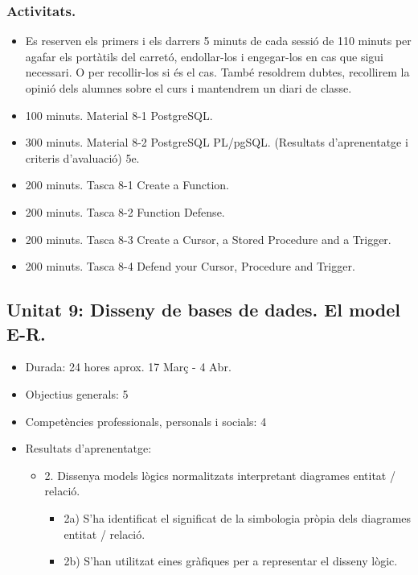 \documentclass[catalan, a4paper, 12pt, titlepage]{article}
\begin{document}
  \subsubsection{Activitats.}
  \begin{itemize}
          \item Es reserven els primers i els darrers 5 minuts de cada sessió de 110 minuts per agafar els portàtils del carretó, endollar-los i engegar-los en cas que sigui necessari. O per recollir-los si és el cas. També resoldrem dubtes, recollirem la opinió dels alumnes sobre el curs i mantendrem un diari de classe.
	  \item 100 minuts. Material 8-1 PostgreSQL.
	  \item 300 minuts. Material 8-2 PostgreSQL PL/pgSQL. (\faGraduationCap Resultats d'aprenentatge i criteris d'avaluació) 5e.
	  \item 200 minuts. Tasca 8-1 Create a Function.
	  \item 200 minuts. Tasca 8-2 Function Defense.
	  \item 200 minuts. Tasca 8-3 Create a Cursor, a Stored Procedure and a Trigger.
	  \item 200 minuts. Tasca 8-4 Defend your Cursor, Procedure and Trigger.
  \end{itemize}

  \subsection{Unitat 9: Disseny de bases de dades. El model E-R.}

  \begin{itemize}
	\item Durada: 24 hores aprox. 17 Març - 4 Abr.
	\item Objectius generals: 5
	\item Competències professionals, personals i socials: 4
	\item Resultats d'aprenentatge: 
		\begin{itemize}
			\item 2. Dissenya models lògics normalitzats interpretant diagrames entitat / relació.
				\begin{itemize}
					\item 2a) S'ha identificat el significat de la simbologia pròpia dels diagrames entitat / relació.
					\item 2b) S'han utilitzat eines gràfiques per a representar el disseny lògic.
				\end{itemize}
		\end{itemize}
  \end{itemize}
\end{document}
